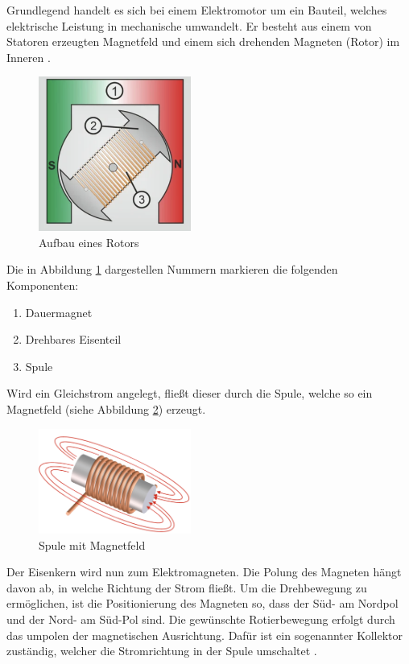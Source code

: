 Grundlegend handelt es sich bei einem Elektromotor um ein Bauteil, welches elektrische Leistung in mechanische umwandelt.
Er besteht aus einem von Statoren erzeugten Magnetfeld und einem sich drehenden Magneten (Rotor) im Inneren \cite*[vgl.][]{Aufbau.Elektromotoren}.

\begin{figure}[htbp]
	\centering
	\includegraphics[width=5cm]{img/AufbauElektromagnet}
	\caption{Aufbau eines Rotors \cite*{Aufbau.Elektromotoren}}
	\label{fig:Elektromagnet}
\end{figure}

Die in Abbildung \ref{fig:Elektromagnet} dargestellen Nummern markieren die folgenden Komponenten:

\begin{enumerate}
	\item Dauermagnet
	\item Drehbares Eisenteil
	\item Spule
\end{enumerate}

Wird ein Gleichstrom angelegt, fließt dieser durch die Spule, welche so ein Magnetfeld (siehe Abbildung \ref{fig:Magnetfeld}) erzeugt.

\begin{figure}[htbp]
	\centering
	\includegraphics[width=5cm]{img/Magnetfeld}
	\caption{Spule mit Magnetfeld \cite*{Aufbau.Elektromotoren}}
	\label{fig:Magnetfeld}
\end{figure}

Der Eisenkern wird nun zum Elektromagneten. Die Polung des Magneten hängt davon ab, in welche Richtung der Strom fließt.
Um die Drehbewegung zu ermöglichen, ist die Positionierung des Magneten so, dass der Süd- am Nordpol und der Nord- am Süd-Pol
sind. Die gewünschte Rotierbewegung erfolgt durch das umpolen der magnetischen Ausrichtung.
Dafür ist ein sogenannter Kollektor zuständig, welcher die Stromrichtung in der Spule umschaltet \cite*[vgl.][]{Aufbau.Elektromotoren}.


